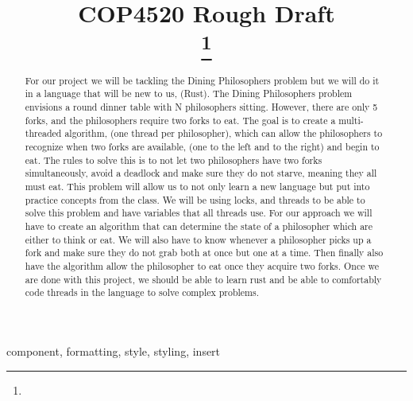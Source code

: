 \documentclass[conference]{IEEEtran}
\begin{document}
	
	\title{COP4520 Rough Draft\\
		{}
		\thanks{}
	}
	
	\author{
		
		\and
		
		\and
		\and
	}
	
	\maketitle
	
	\begin{abstract}
		For our project we will be tackling the Dining Philosophers problem but we will do it in a language that will be new to us, (Rust). The Dining Philosophers problem envisions a round dinner table with N philosophers sitting. However, there are only 5 forks, and the philosophers require two forks to eat. The goal is to create a multi-threaded algorithm, (one thread per philosopher), which can allow the philosophers to recognize when two forks are available, (one to the left and to the right) and begin to eat. The rules to solve this is to not let two philosophers have two forks simultaneously, avoid a deadlock and make sure they do not starve, meaning they all must eat. This problem will allow us to not only learn a new language but put into practice concepts from the class. We will be using locks, and threads to be able to solve this problem and have variables that all threads use. For our approach we will have to create an algorithm that can determine the state of a philosopher which are either to think or eat. We will also have to know whenever a philosopher picks up a fork and make sure they do not grab both at once but one at a time. Then finally also have the algorithm allow the philosopher to eat once they acquire two forks. Once we are done with this project, we should be able to learn rust and be able to comfortably code threads in the language to solve complex problems.
	\end{abstract}
	
	\begin{IEEEkeywords}
		component, formatting, style, styling, insert
	\end{IEEEkeywords}
	
\end{document}
